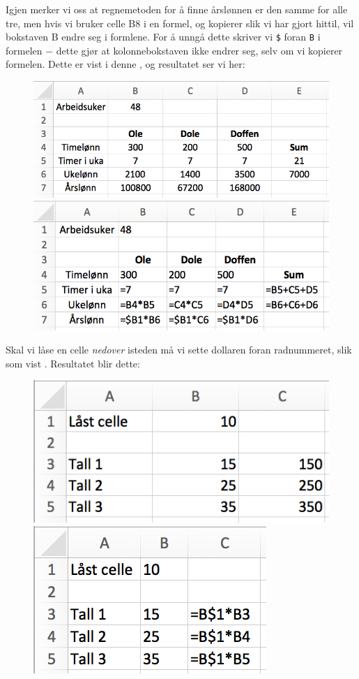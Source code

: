 Igjen merker vi oss at regnemetoden for å finne årslønnen er den samme for alle tre, men hvis vi bruker celle B8 i en formel, og kopierer slik vi har gjort hittil, vil bokstaven B endre seg i formlene. For å unngå dette skriver vi {\tt \$} foran {\tt B} i formelen $ - $ dette gjør at kolonnebokstaven ikke endrer seg, selv om vi kopierer formelen. Dette er vist i denne , og resultatet ser vi her:
\begin{figure}[H]
	\centering
	\includegraphics[scale=0.3]{figs/ex12}\\[5pt]
	\includegraphics[scale=0.3]{figs/ex13}
\end{figure}
Skal vi låse en celle \textsl{nedover} isteden må vi sette dollaren foran radnummeret, slik som vist . Resultatet blir dette:
\begin{figure}[H]
	\centering
	\includegraphics[scale=0.3]{figs/ex16}\qquad
	\includegraphics[scale=0.3]{figs/ex17}
\end{figure}
